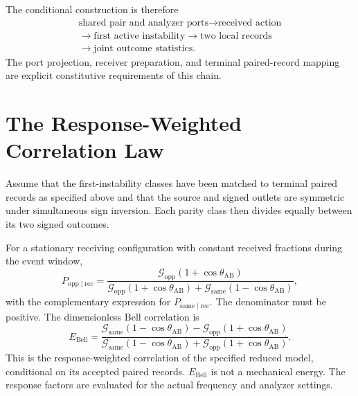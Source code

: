 The conditional construction is therefore
\begin{equation}
    \boxed{
    \begin{gathered}
    \text{shared pair and analyzer ports}
       \longrightarrow\text{received action}\\
    \longrightarrow\text{first active instability}
       \longrightarrow\text{two local records}\\
    \longrightarrow\text{joint outcome statistics}.
    \end{gathered}
    }
    \label{eq:entanglement_probability_chain}
\end{equation}
The port projection, receiver preparation, and terminal paired-record mapping are explicit constitutive requirements of this chain.

\section{The Response-Weighted Correlation Law}
\label{sec:entanglement_singlet_correlation}

Assume that the first-instability classes have been matched to terminal paired records as specified above and that the source and signed outlets are symmetric under simultaneous sign inversion. Each parity class then divides equally between its two signed outcomes.

For a stationary receiving configuration with constant received fractions during the event window,
\begin{equation}
    P_{\mathrm{opp}\mid\mathrm{rec}}
    =\frac{
      \mathcal G_{\mathrm{opp}}(1+\cos\theta_{\mathrm{AB}})
    }{
      \mathcal G_{\mathrm{opp}}(1+\cos\theta_{\mathrm{AB}})
      +\mathcal G_{\mathrm{same}}(1-\cos\theta_{\mathrm{AB}})
    },
\end{equation}
with the complementary expression for $P_{\mathrm{same}\mid\mathrm{rec}}$. The denominator must be positive. The dimensionless Bell correlation is
\begin{equation}
    \boxed{
    E_{\mathrm{Bell}}
    =\frac{
      \mathcal G_{\mathrm{same}}(1-\cos\theta_{\mathrm{AB}})
      -\mathcal G_{\mathrm{opp}}(1+\cos\theta_{\mathrm{AB}})
    }{
      \mathcal G_{\mathrm{same}}(1-\cos\theta_{\mathrm{AB}})
      +\mathcal G_{\mathrm{opp}}(1+\cos\theta_{\mathrm{AB}})
    }
    }.
\end{equation}
This is the response-weighted correlation of the specified reduced model, conditional on its accepted paired records. $E_{\mathrm{Bell}}$ is not a mechanical energy. The response factors are evaluated for the actual frequency and analyzer settings.

